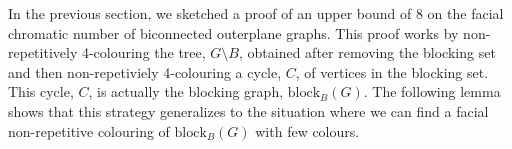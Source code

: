 \documentclass{patmorin}
\newcommand{\block}{\mathrm{block}}
\begin{document}
In the previous section, we sketched a proof of an upper bound of 8 on the facial chromatic number of biconnected outerplane graphs.  This proof works by non-repetitively 4-colouring the tree, $G\setminus B$, obtained after removing the blocking set and then non-repetiviely 4-colouring a cycle, $C$, of vertices in the blocking set.  This cycle, $C$, is actually the blocking graph, $\block_B(G)$.  The following lemma shows that this strategy generalizes to the situation where we can find a facial non-repetitive colouring of $\block_B(G)$ with few colours.


%

%
%
\end{document}
